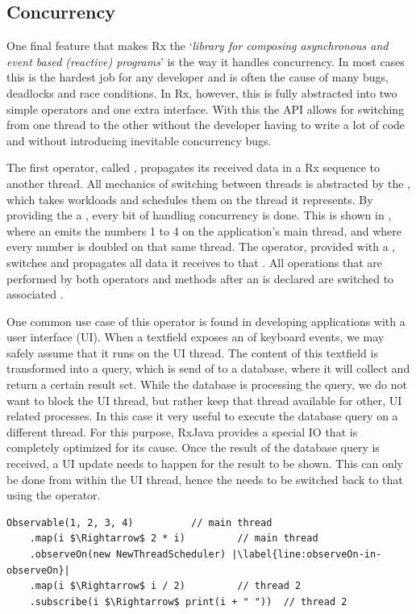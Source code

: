 \subsection{Concurrency}
One final feature that makes Rx the `\textit{library for composing asynchronous and event based (reactive) programs}' is the way it handles concurrency. In most cases this is the hardest job for any developer and is often the cause of many bugs, deadlocks and race conditions. In Rx, however, this is fully abstracted into two simple operators and one extra interface. With this the API allows for switching from one thread to the other without the developer having to write a lot of code and without introducing inevitable concurrency bugs.

The first operator, called , propagates its received data in a Rx sequence to another thread. All mechanics of switching between threads is abstracted by the \sch, which takes workloads and schedules them on the thread it represents. By providing the  a \sch, every bit of handling concurrency is done. This is shown in , where an \obs emits the numbers 1 to 4 on the application's main thread, and where every number is doubled on that same thread. The  operator, provided with a , switches and propagates all data it receives to that \sch. All operations that are performed by both operators and  methods after an  is declared are switched to associated \sch.

One common use case of this operator is found in developing applications with a user interface (UI). When a textfield exposes an \obs of keyboard events, we may safely assume that it runs on the UI thread. The content of this textfield is transformed into a query, which is send of to a database, where it will collect and return a certain result set. While the database is processing the query, we do not want to block the UI thread, but rather keep that thread available for other, UI related processes. In this case it very useful to execute the database query on a different thread. For this purpose, RxJava provides a special IO \sch that is completely optimized for its cause. Once the result of the database query is received, a UI update needs to happen for the result to be shown. This can only be done from within the UI thread, hence the \obs needs to be switched back to that \sch using the  operator.

\begin{minipage}{\linewidth}
\begin{lstlisting}[style=ScalaStyle, caption={\code{observeOn} in a Rx sequence}, label={lst:observeOn}]
Observable(1, 2, 3, 4)			// main thread
    .map(i $\Rightarrow$ 2 * i)			// main thread
    .observeOn(new NewThreadScheduler) |\label{line:observeOn-in-observeOn}|
    .map(i $\Rightarrow$ i / 2)			// thread 2
    .subscribe(i $\Rightarrow$ print(i + " "))	// thread 2
\end{lstlisting}
\end{minipage}

